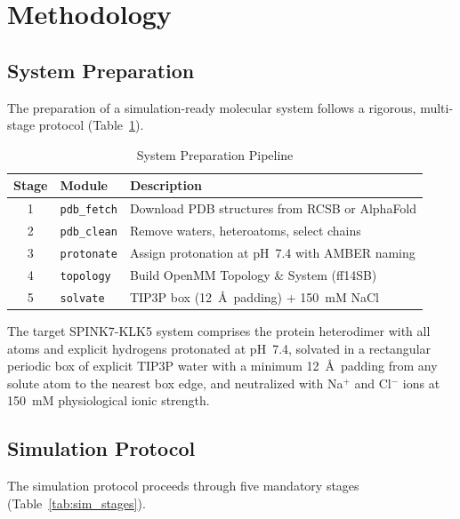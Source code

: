\documentclass[conference]{IEEEtran}
\begin{document}
\section{Methodology}\label{sec:methodology}

\subsection{System Preparation}\label{sec:prep}

The preparation of a simulation-ready molecular system follows a rigorous,
multi-stage protocol (Table~\ref{tab:prep}).

\begin{table}[H]
  \centering
  \caption{System Preparation Pipeline}
  \label{tab:prep}
  \begin{tabular}{@{}clp{4.2cm}@{}}
    \toprule
    \textbf{Stage} & \textbf{Module} & \textbf{Description} \\
    \midrule
    1 & \texttt{pdb\_fetch} & Download PDB structures from RCSB or AlphaFold \\
    2 & \texttt{pdb\_clean} & Remove waters, heteroatoms, select chains \\
    3 & \texttt{protonate} & Assign protonation at pH~7.4 with AMBER naming \\
    4 & \texttt{topology} & Build OpenMM Topology \& System (ff14SB) \\
    5 & \texttt{solvate} & TIP3P box (12~\AA\ padding) + 150~mM NaCl \\
    \bottomrule
  \end{tabular}
\end{table}

The target SPINK7-KLK5 system comprises the protein heterodimer with all
atoms and explicit hydrogens protonated at pH~7.4, solvated in a
rectangular periodic box of explicit TIP3P water with a minimum 12~\AA\
padding from any solute atom to the nearest box edge, and neutralized with
Na$^+$ and Cl$^-$ ions at 150~mM physiological ionic strength.

\subsection{Simulation Protocol}\label{sec:sim_protocol}

The simulation protocol proceeds through five mandatory stages
(Table~\ref{tab:sim_stages}).
\end{document}
